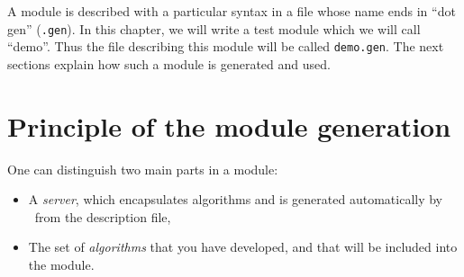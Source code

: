 %
%
%
%
%
%
%

A module is described with a particular syntax  in a file whose name ends
in ``dot   gen'' (\texttt{.gen}).  In this   chapter, we will  write  a test
module which we will call ``demo''.  Thus the file describing this module
will be  called  \texttt{demo.gen}.  The next  sections  explain  how such a
module is generated and used.

\section{Principle of the module generation}
\label{sec|session|principle}

One can distinguish two main parts in a module:

\begin{itemize}
   \item A \emph{server}, which encapsulates algorithms and is generated
automatically by \GenoM\ from the description file,
   \item The set of \emph{algorithms} that you have developed, and that
will be included into the module.
\end{itemize}

